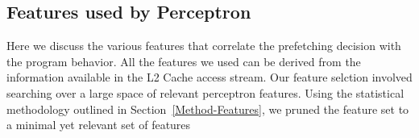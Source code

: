 \subsection{Features used by Perceptron}
\label{Impl-Features}
Here we discuss the various features that correlate the prefetching
decision with the program behavior. All the features we used can be 
derived from the information available in the L2 Cache access stream.
Our feature selction involved searching over a large space of 
relevant perceptron features. Using the statistical methodology 
outlined in Section~\ref{Method-Features}, we pruned the feature 
set to a minimal yet relevant set of features


